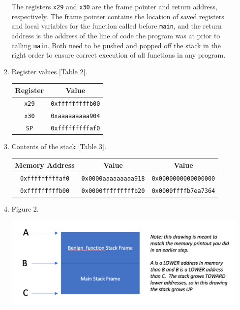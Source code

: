 \documentclass[11pt]{article}
\newcommand{\fn}[1]{\texttt{#1}}
\begin{document}
\begin{enumerate}[left = \parindent, label=\textbf{Task \arabic* -}]
\begin{enumerate}
        The registers \fn{x29} and \fn{x30} are the frame pointer and return address, respectively. The frame pointer contains the location of saved registers and local variables for the function called before \fn{main}, and the return address is the address of the line of code the program was at prior to calling \fn{main}. Both need to be pushed and popped off the stack in the right order to ensure correct execution of all functions in any program.
        \item Register values [Table 2].
        \begin{center}
            \begin{tabular}[h]{|c|c|}
                \hline\textbf{Register} & \textbf{Value} \\
                \hline\fn{x29} & \fn{0xfffffffffb00}\\
                \hline\fn{x30} & \fn{0xaaaaaaaaa904}\\
                \hline\fn{SP} & \fn{0xfffffffffaf0}\\
                \hline
            \end{tabular}
        \end{center}
        \item Contents of the stack [Table 3].
        \begin{center}
            \begin{tabular}[h]{|c|c|c|}
                \hline\textbf{Memory Address} & \textbf{Value} & \textbf{Value} \\
                \hline\fn{0xfffffffffaf0} & \fn{0x0000aaaaaaaaa918} & \fn{0x0000000000000000}\\
                \hline\fn{0xfffffffffb00} & \fn{0x0000fffffffffb20} & \fn{0x0000ffffb7ea7364}\\
                \hline
            \end{tabular}
        \end{center}
        \item Figure 2.
        \begin{center}
            \includegraphics[scale=.55]{figure2.png}

\end{center}
\end{enumerate}
\end{enumerate}
\end{document}
